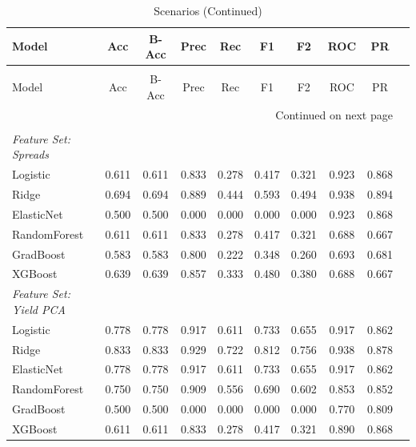 \begin{longtable}{lccccccccc}
\caption{Model Performance Scenarios} \label{tab:s} \\
\toprule
Model & Acc & B-Acc & Prec & Rec & F1 & F2 & ROC & PR \\
\midrule
\endfirsthead

\caption[]{Scenarios (Continued)} \\
\toprule
Model & Acc & B-Acc & Prec & Rec & F1 & F2 & ROC & PR \\
\midrule
\endhead

\midrule
\multicolumn{9}{r}{Continued on next page} \\
\bottomrule
\endfoot
\bottomrule
\endlastfoot

\multicolumn{9}{l}{\textbf{Scenario: GFC (2007--2009)}} \\
\textit{Feature Set: Spreads} \\
\midrule
Logistic     & 0.611 & 0.611 & 0.833 & 0.278 & 0.417 & 0.321 & 0.923 & 0.868 \\
Ridge        & 0.694 & 0.694 & 0.889 & 0.444 & 0.593 & 0.494 & 0.938 & 0.894 \\
ElasticNet   & 0.500 & 0.500 & 0.000 & 0.000 & 0.000 & 0.000 & 0.923 & 0.868 \\
RandomForest & 0.611 & 0.611 & 0.833 & 0.278 & 0.417 & 0.321 & 0.688 & 0.667 \\
GradBoost    & 0.583 & 0.583 & 0.800 & 0.222 & 0.348 & 0.260 & 0.693 & 0.681 \\
XGBoost      & 0.639 & 0.639 & 0.857 & 0.333 & 0.480 & 0.380 & 0.688 & 0.667 \\
\addlinespace
\textit{Feature Set: Yield PCA} \\
\midrule
Logistic     & 0.778 & 0.778 & 0.917 & 0.611 & 0.733 & 0.655 & 0.917 & 0.862 \\
Ridge        & 0.833 & 0.833 & 0.929 & 0.722 & 0.812 & 0.756 & 0.938 & 0.878 \\
ElasticNet   & 0.778 & 0.778 & 0.917 & 0.611 & 0.733 & 0.655 & 0.917 & 0.862 \\
RandomForest & 0.750 & 0.750 & 0.909 & 0.556 & 0.690 & 0.602 & 0.853 & 0.852 \\
GradBoost    & 0.500 & 0.500 & 0.000 & 0.000 & 0.000 & 0.000 & 0.770 & 0.809 \\
XGBoost      & 0.611 & 0.611 & 0.833 & 0.278 & 0.417 & 0.321 & 0.890 & 0.868 \\


\end{longtable}
